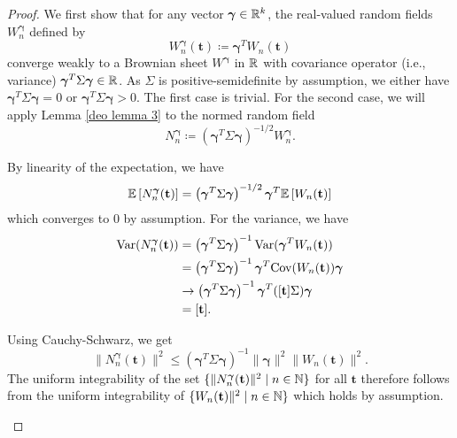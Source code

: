 \begin{proof}
    We first show that for any vector ${\boldsymbol{\gamma}} \in \mathbb{R}^k$, the real-valued random fields $W_n^{\boldsymbol{\gamma}}$ defined by
    \[ W_n^{\boldsymbol{\gamma}}(\mathbf{t}) \coloneqq {\boldsymbol{\gamma}}^T W_n(\mathbf{t}) \]
    converge weakly to a Brownian sheet $W^{\boldsymbol{\gamma}}$ in $\mathbb{R}$ with covariance operator (i.e., variance) ${\boldsymbol{\gamma}}^T \Sigma {\boldsymbol{\gamma}} \in \mathbb{R}$. As $\Sigma$ is positive-semidefinite by assumption, we either have ${\boldsymbol{\gamma}}^T \Sigma {\boldsymbol{\gamma}} = 0$ or ${\boldsymbol{\gamma}}^T \Sigma {\boldsymbol{\gamma}} > 0$. The first case is trivial. For the second case, we will apply Lemma \ref{deo lemma 3} to the normed random field \[ N_n^{\boldsymbol{\gamma}} \coloneqq \left({\boldsymbol{\gamma}}^T \Sigma {\boldsymbol{\gamma}} \right)^{-1/2} W_n^{\boldsymbol{\gamma}}. \] 
    \begin{aufzii}
        \item By linearity of the expectation, we have
        \[ \mathbb{E}\left[N_n^{\boldsymbol{\gamma}}(\mathbf{t})\right] = \left({\boldsymbol{\gamma}}^T \Sigma {\boldsymbol{\gamma}} \right)^{-1/2} {\boldsymbol{\gamma}}^T \mathbb{E}\left[W_n(\mathbf{t})\right] \]
        which converges to $0$ by assumption. For the variance, we have
        \begin{align*}
            \mathrm{Var}(N_n^{\boldsymbol{\gamma}}(\mathbf{t})) 
            & = \left({\boldsymbol{\gamma}}^T \Sigma {\boldsymbol{\gamma}} \right)^{-1} \mathrm{Var}({\boldsymbol{\gamma}}^T W_n(\mathbf{t})) \\
            & =  \left({\boldsymbol{\gamma}}^T \Sigma {\boldsymbol{\gamma}} \right)^{-1} {\boldsymbol{\gamma}}^T \mathrm{Cov}(W_n(\mathbf{t})) {\boldsymbol{\gamma}} \\
            & \to \left({\boldsymbol{\gamma}}^T \Sigma {\boldsymbol{\gamma}} \right)^{-1} {\boldsymbol{\gamma}}^T ([\mathbf{t}]\Sigma) {\boldsymbol{\gamma}} \\
            & = [\mathbf{t}].
        \end{align*}
        \item Using Cauchy-Schwarz, we get
        \[ \|N_n^{\boldsymbol{\gamma}}(\mathbf{t})\|^2 \leq \left({\boldsymbol{\gamma}}^T \Sigma {\boldsymbol{\gamma}} \right)^{-1} \| {\boldsymbol{\gamma}} \|^2 \| W_n(\mathbf{t}) \|^2. \]
        The uniform integrability of the set $\{ \|N_n^{\boldsymbol{\gamma}}(\mathbf{t})\|^2 \mid n \in \mathbb{N} \}$ for all $\mathbf{t}$ therefore follows from the uniform integrability of $\{ W_n(\mathbf{t})\|^2 \mid n \in \mathbb{N}  \}$ which holds by assumption.

\end{aufzii}
\end{proof}
